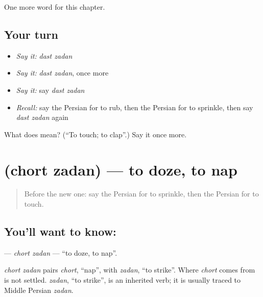 \begin{grammarlens}[title={What you've built}]
One more word for this chapter.
\end{grammarlens}

\subsection*{Your turn}
\begin{itemize}
\raggedright
  \item \emph{Say it:} \emph{dast zadan}
  \item \emph{Say it:} \emph{dast zadan}, once more
  \item \emph{Say it:} say \emph{dast zadan}
  \item \emph{Recall:} say the Persian for to rub, then the Persian for to sprinkle, then say \emph{dast zadan} again
\end{itemize}

\begin{tcolorbox}[breakable,colback=teal!4,colframe=teal!35!black,title={Before you move on}]
What does   mean? (\textquotedblleft{}To touch; to clap\textquotedblright{}.) Say it once more.
\end{tcolorbox}
\section[\texorpdfstring{\fa{چرت} \fa{زدن} (chort zadan)}{چرت زدن (chort zadan)}]{  (chort zadan) — to doze, to nap}

\label{lesson:FA-C148-chort-zadan}



\begin{quote}
Before the new one: say the Persian for to sprinkle, then the Persian for to touch.
\end{quote}

\subsection*{You'll want to know:  }
\textbf{ } — \emph{chort zadan} — \textquotedblleft{}to doze, to nap\textquotedblright{}.

\begin{cousinweb}
\emph{chort zadan} pairs \emph{chort}, \textquotedblleft{}nap\textquotedblright{}, with \emph{zadan}, \textquotedblleft{}to strike\textquotedblright{}. Where \emph{chort} comes from is not settled. \emph{zadan}, \textquotedblleft{}to strike\textquotedblright{}, is an inherited verb; it is usually traced to Middle Persian \emph{zadan}.
\end{cousinweb}

